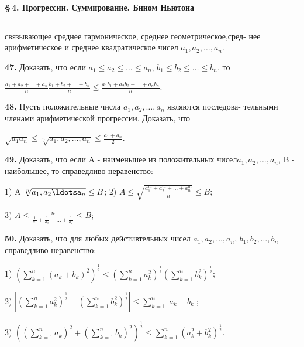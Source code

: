 \documentclass[a5paper, 10pt]{book}
\author{Александр Недосекин}
\date{15.05.2023}
\begin{document}
\setcounter{page}{33}
    
 \begin{center}
         \textbf{\S\,4. Прогрессии. Суммирование. Бином Ньютона}
               \noindent\rule{\textwidth}{1pt}
    \end{center}
\begin{spacing}
     связывающее среднее гармоническое, среднее геометрическое,сред- \per
     нее арифметическое и среднее квадратическое чисел $a_{1}, a_{2}, \ldots, a_{n}$.
    \par \textbf{47. } Доказать, что если $a_{1} \leq a_{2} \leq \ldots \leq a_{n}$, $b_{1} \leq b_{2} \leq \ldots \leq b_{n}$, то
    \begin{center}
        $\frac{a_{1} + a_{2} + \ldots + a_{n}}{n} \frac{b_{1} + b_{2} + \ldots + b_{n}}{n} \leq \frac{a_{1}b_{1} + a_{2}b_{2} + \ldots + a_{n}b_{n}}{n}$.
        \par \textbf{48. } Пусть положительные числа $a_{1},a_{2}, \ldots, a_{n}$ являются последова- \per
        тельными членами арифметической прогрессии. Доказать, что
        \begin{center}
            $\sqrt{a_{1}a_{n}} \leq \sqrt[n]{a_{1},a_{2}, \ldots, a_{n}} \leq \frac{a_{1} + a_{n}}{2}$.
        \end{center}
    \end{center}
    \par \textbf{49. } Доказать, что если A - наименьшее из положительных чисел\per $a_{1},a_{2}, \ldots, a_{n}$, B - наибольшее, то справедливо неравенство:
    \par 1) A \leq $\sqrt[n]{a_{1},a_{2}\ldotsa_{n}} \leq B$;   2) $A \leq \sqrt{\frac{a^m_{1} + a^m_{2} + \ldots + a^m_{n}}{n}} \leq B$;
    \par 3) $A \leq \frac{n}{\frac{1}{a_{1}} + \frac{1}{a_{2}} + \ldots + \frac{1}{a_{n}}} \leq B$;
    \par \textbf{50. } Доказать, что для любых дейстивтельных чисел $a_{1},a_{2}, \ldots, a_{n}$,\per
    $b_{1},b_{2}, \ldots, b_{n}$ справедливо неравенство:
    \par 1) $(\sum\limits_{k=1}^{n}{(a_{k} + b_{k})^2})^{\frac{1}{2}} \leq (\sum\limits_{k=1}^{n}{a^2_{k}})^{\frac{1}{2}} (\sum\limits_{k=1}^{n}{b^2_{k}})^{\frac{1}{2}}$;
    \par 2) $|(\sum\limits_{k=1}^{n}{a^2_{k}})^{\frac{1}{2}} - (\sum\limits_{k=1}^{n}{b^2_{k}})^{\frac{1}{2}}| \leq \sum\limits_{k=1}^{n}{|a_{k} - b_{k}|}$;
    \par 3) $((\sum\limits_{k=1}^{n}{a_{k}})^{2} + (\sum\limits_{k=1}^{n}{b_{k}})^{2})^{\frac{1}{2}} \leq \sum\limits_{k=1}^{n}{(a^2_{k} + b^2_{k})^{\frac{1}{2}}}$.

\end{spacing}
\end{document}
